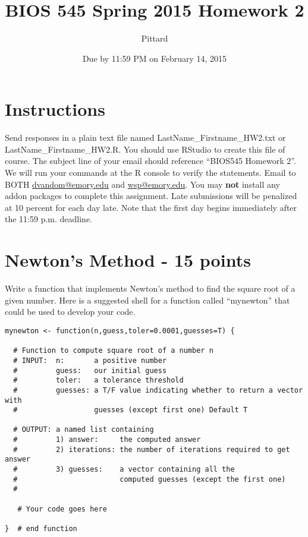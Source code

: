 \documentclass{article}
\begin{document}

\title{BIOS 545 Spring 2015 Homework 2}
\author{Pittard}
\date{Due by 11:59 PM on February 14, 2015}
\maketitle


\section*{Instructions}
Send responses in a plain text file named LastName\_Firstname\_HW2.txt or LastName\_Firstname\_HW2.R. You should use RStudio to create this file of course. The subject line of your email should reference ``BIOS545 Homework 2''. We will run your commands at the R console to verify the statements. Email to BOTH \url{dvandom@emory.edu} and \url{wsp@emory.edu}. You may \textbf{not} install any addon packages to complete this assignment. Late submissions will be penalized at 10 percent for each day late. Note that the first day begins immediately after the 11:59 p.m. deadline. 

\section{Newton's Method - 15 points} Write a function that implements Newton's method to find the square root of a given number. Here is a suggested shell for a function called ``mynewton'' that could be used to develop your code.
\begin{verbatim}
mynewton <- function(n,guess,toler=0.0001,guesses=T) {
  
  # Function to compute square root of a number n
  # INPUT:  n:       a positive number
  #         guess:   our initial guess
  #         toler:   a tolerance threshold
  #         guesses: a T/F value indicating whether to return a vector with 
  #                  guesses (except first one) Default T
  
  # OUTPUT: a named list containing 
  #         1) answer:     the computed answer
  #         2) iterations: the number of iterations required to get answer
  #         3) guesses:    a vector containing all the 
  #                        computed guesses (except the first one)
  #

   # Your code goes here

}  # end function

\end{verbatim}
\end{document}
